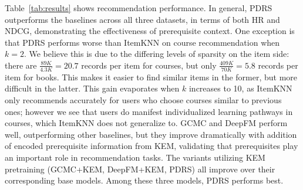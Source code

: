 

Table~\ref{tab:results} shows recommendation performance.
In general, PDRS outperforms the baselines across all three datasets, in terms of both HR and NDCG, demonstrating the effectiveness of prerequisite context. One exception is that PDRS performs worse than ItemKNN on course recommendation when $k = 2$. We believe this is due to the differing levels of sparsity on the item side: there are $\frac{89K}{4.3K}=20.7$ records per item for courses, but only $\frac{409K}{70K}=5.8$ records per item for books. This makes it easier to find similar items in the former, but more difficult in the latter. This gain evaporates when $k$ increases to 10, as ItemKNN only recommends accurately for users who choose courses similar to previous ones; however we see that users do manifest individualized learning pathways in courses, which ItemKNN does not generalize to. 
GCMC and DeepFM perform well, outperforming other baselines, but they improve dramatically with addition of encoded prerequisite information from KEM, validating that prerequisites play an important role in recommendation tasks.
The variants utilizing KEM pretraining (GCMC+KEM, DeepFM+KEM, PDRS) all improve over their corresponding base models.
Among these three models, PDRS performs best.

